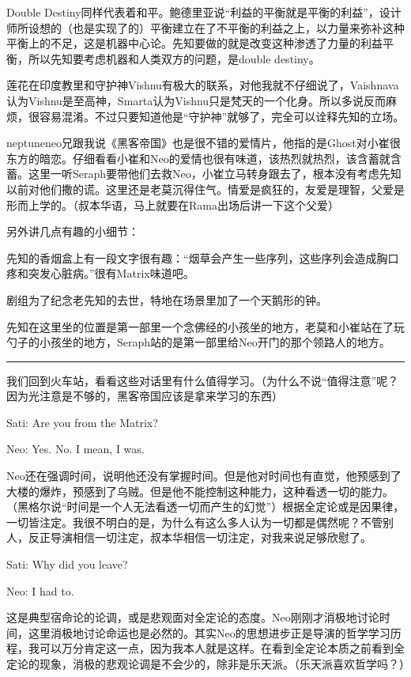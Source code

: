\documentclass[UTF8]{ctexart}
\newcommand{\myparsep}{\noindent \rule[0.5ex]{\linewidth}{1pt}}
\newenvironment{myquote}{\color{green} \setlength{\leftskip}{6em} \setlength{\rightskip}{4em} \setlength{\parindent}{-2em}}{\par}
\begin{document}
Double Destiny同样代表着和平。鲍德里亚说“利益的平衡就是平衡的利益”，设计师所设想的（也是实现了的）平衡建立在了不平衡的利益之上，以力量来弥补这种平衡上的不足，这是机器中心论。先知要做的就是改变这种渗透了力量的利益平衡，所以先知要考虑机器和人类双方的问题，是double destiny。

莲花在印度教里和守护神Vishnu有极大的联系，对他我就不仔细说了，Vaishnava认为Vishnu是至高神，Smarta认为Vishnu只是梵天的一个化身。所以多说反而麻烦，很容易混淆。不过只要知道他是“守护神”就够了，完全可以诠释先知的立场。

neptuneneo兄跟我说《黑客帝国》也是很不错的爱情片，他指的是Ghost对小崔很东方的暗恋。仔细看看小崔和Neo的爱情也很有味道，该热烈就热烈，该含蓄就含蓄。这里一听Seraph要带他们去救Neo，小崔立马转身跟去了，根本没有考虑先知以前对他们撒的谎。这里还是老莫沉得住气。情爱是疯狂的，友爱是理智，父爱是形而上学的。（叔本华语，马上就要在Rama出场后讲一下这个父爱）

另外讲几点有趣的小细节：

先知的香烟盒上有一段文字很有趣：“烟草会产生一些序列，这些序列会造成胸口疼和突发心脏病。”很有Matrix味道吧。

剧组为了纪念老先知的去世，特地在场景里加了一个天鹅形的钟。

先知在这里坐的位置是第一部里一个念佛经的小孩坐的地方，老莫和小崔站在了玩勺子的小孩坐的地方，Seraph站的是第一部里给Neo开门的那个领路人的地方。

\myparsep

我们回到火车站，看看这些对话里有什么值得学习。（为什么不说“值得注意”呢？因为光注意是不够的，黑客帝国应该是拿来学习的东西）

\begin{myquote}
Sati: Are you from the Matrix?

Neo: Yes. No. I mean, I was.
\end{myquote}

Neo还在强调时间，说明他还没有掌握时间。但是他对时间也有直觉，他预感到了大楼的爆炸，预感到了乌贼。但是他不能控制这种能力，这种看透一切的能力。（黑格尔说“时间是一个人无法看透一切而产生的幻觉”）根据全定论或是因果律，一切皆注定。我很不明白的是，为什么有这么多人认为一切都是偶然呢？不管别人，反正导演相信一切注定，叔本华相信一切注定，对我来说足够欣慰了。

\begin{myquote}
Sati: Why did you leave?

Neo: I had to.
\end{myquote}

这是典型宿命论的论调，或是悲观面对全定论的态度。Neo刚刚才消极地讨论时间，这里消极地讨论命运也是必然的。其实Neo的思想进步正是导演的哲学学习历程，我可以万分肯定这一点，因为我本人就是这样。在看到全定论本质之前看到全定论的现象，消极的悲观论调是不会少的，除非是乐天派。（乐天派喜欢哲学吗？）
\end{document}
